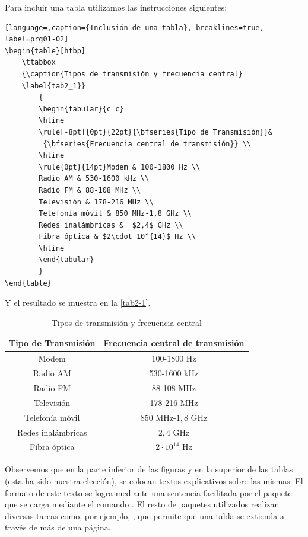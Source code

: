 Para incluir una tabla utilizamos las instrucciones siguientes:
\begin{lstlisting}[language=,caption={Inclusión de una tabla}, breaklines=true, label=prg01-02]
\begin{table}[htbp]
	\ttabbox
	{\caption{Tipos de transmisión y frecuencia central} 
	\label{tab2_1}}
		{
		\begin{tabular}{c c}
		\hline
		\rule[-8pt]{0pt}{22pt}{\bfseries{Tipo de Transmisión}}&
		 {\bfseries{Frecuencia central de transmisión}} \\
		\hline
		\rule{0pt}{14pt}Modem & 100-1800 Hz \\
		Radio AM & 530-1600 kHz \\
		Radio FM & 88-108 MHz \\
		Televisión & 178-216 MHz \\
		Telefonía móvil & 850 MHz-1,8 GHz \\
		Redes inalámbricas &  $2,4$ GHz \\
		Fibra óptica & $2\cdot 10^{14}$ Hz \\
		\hline
		\end{tabular}
		}
\end{table}
\end{lstlisting}

Y el resultado se muestra en la \autoref{tab2-1}.

\begin{table}[htbp]
	\ttabbox
	{\caption{Tipos de transmisión y frecuencia central} \label{tab2-1}}
		{
		\begin{tabular}{c c}
		\hline
		\rule[-8pt]{0pt}{22pt}{\bfseries{Tipo de Transmisión}}& {\bfseries{Frecuencia central de transmisión}} \\
		\hline
		\rule{0pt}{14pt}Modem & 100-1800 Hz \\
		Radio AM & 530-1600 kHz \\
		Radio FM & 88-108 MHz \\
		Televisión & 178-216 MHz \\
		Telefonía móvil & 850 MHz-$1,8$ GHz \\
		Redes inalámbricas &  $2,4$ GHz \\
		Fibra óptica & $2\cdot 10^{14}$ Hz \\
		\hline
		\end{tabular}
		}
\end{table}

Observemos  que en la parte inferior de las figuras y en la superior de las tablas (esta ha sido nuestra elección), se
colocan textos explicativos sobre las mismas. El formato de este texto se logra mediante una sentencia facilitada por el
paquete que se carga mediante el comando . El resto de paquetes utilizados realizan
diversas tareas como, por ejemplo, , que permite que una tabla se extienda a través de
más de una página. 
